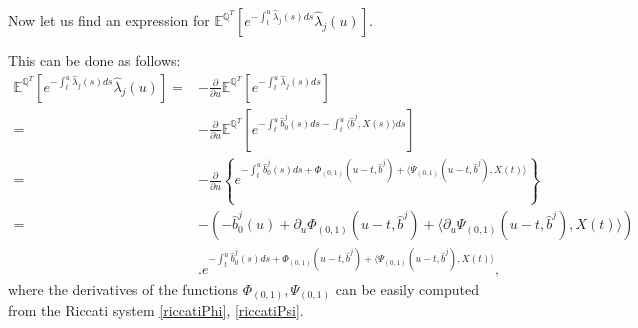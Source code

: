 \documentclass[12pt,a4paper]{article}
\theoremstyle{plain}
\numberwithin{equation}{section}
\begin{document}
Now let us find an expression for
 $\mathbb{E}^{\mathbb{Q}^{T}}\left[e^{-\int_t^u \hat{\lambda}_j(s)ds}\hat{\lambda}_j(u)\right]$.


This can be done as follows:
\begin{align*}\label{EXP}
\mathbb{E}^{\mathbb{Q}^{T}}\left[e^{-\int_t^u \hat{\lambda}_j(s)ds}\hat{\lambda}_j(u)\right]=&-\frac{\partial}{\partial u}\mathbb{E}^{\mathbb{Q}^{T}}\left[e^{-\int_t^u \hat{\lambda}_j(s)ds}\right]\\
=&-\frac{\partial}{\partial u}\mathbb{E}^{\mathbb{Q}^{T}}\left[e^{-\int_t^u \hat{b}_0^j(s)ds-\int_t^u \langle\hat{b}^j, X(s)\rangle ds}\right]\\
=&-\frac{\partial}{\partial u}\left\{e^{-\int_t^u \hat{b}_0^j(s) ds+\Phi_{(0,1)}(u-t,\hat{b}^j)+\langle\Psi_{(0,1)}(u-t,\hat{b}^j),X(t)\rangle} \right\}\\
=&-\left(-\hat{b}_0^j(u)+ \partial_u\Phi_{(0,1)}(u-t,\hat{b}^j)+\langle\partial_u \Psi_{(0,1)}(u-t,\hat{b}^j),X(t)\rangle\right)\\
&.e^{-\int_t^u \hat{b}_0^j(s) ds+\Phi_{(0,1)}(u-t,\hat{b}^j)+\langle\Psi_{(0,1)}(u-t,\hat{b}^j),X(t)\rangle} ,
\end{align*}
where the derivatives of the functions $\Phi_{(0,1)},\Psi_{(0,1)}$ can be easily computed from the Riccati system \eqref{riccatiPhi}, \eqref{riccatiPsi}.
\end{document}
